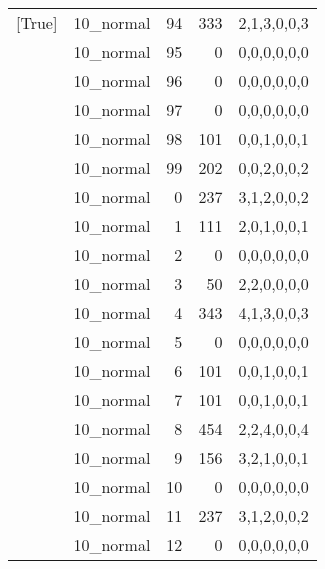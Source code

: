 \begin{tabular}{llrrl}
 [True]          & 10\_normal           &            94 &                   333 & 2,1,3,0,0,3   \\
 [True]          & 10\_normal           &            95 &                     0 & 0,0,0,0,0,0   \\
 [True]          & 10\_normal           &            96 &                     0 & 0,0,0,0,0,0   \\
 [True]          & 10\_normal           &            97 &                     0 & 0,0,0,0,0,0   \\
 [True]          & 10\_normal           &            98 &                   101 & 0,0,1,0,0,1   \\
 [True]          & 10\_normal           &            99 &                   202 & 0,0,2,0,0,2   \\
 [True]          & 10\_normal           &             0 &                   237 & 3,1,2,0,0,2   \\
 [True]          & 10\_normal           &             1 &                   111 & 2,0,1,0,0,1   \\
 [True]          & 10\_normal           &             2 &                     0 & 0,0,0,0,0,0   \\
 [True]          & 10\_normal           &             3 &                    50 & 2,2,0,0,0,0   \\
 [True]          & 10\_normal           &             4 &                   343 & 4,1,3,0,0,3   \\
 [True]          & 10\_normal           &             5 &                     0 & 0,0,0,0,0,0   \\
 [True]          & 10\_normal           &             6 &                   101 & 0,0,1,0,0,1   \\
 [True]          & 10\_normal           &             7 &                   101 & 0,0,1,0,0,1   \\
 [True]          & 10\_normal           &             8 &                   454 & 2,2,4,0,0,4   \\
 [True]          & 10\_normal           &             9 &                   156 & 3,2,1,0,0,1   \\
 [True]          & 10\_normal           &            10 &                     0 & 0,0,0,0,0,0   \\
 [True]          & 10\_normal           &            11 &                   237 & 3,1,2,0,0,2   \\
 [True]          & 10\_normal           &            12 &                     0 & 0,0,0,0,0,0   \\

\end{tabular}

